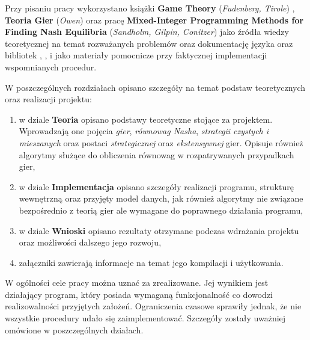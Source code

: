 \documentclass[polish]{standalone}
\begin{document}
Przy pisaniu pracy wykorzystano książki \textbf{Game Theory} (\textit{Fudenberg, Tirole}) \cite{FT-GT},
\textbf{Teoria Gier} (\textit{Owen}) \cite{O-GT} oraz pracę \textbf{Mixed-Integer Programming Methods for Finding Nash
Equilibria} (\textit{Sandholm, Gilpin, Conitzer}) \cite{SCG-NE} jako źródła wiedzy teoretycznej na temat rozważanych
problemów oraz dokumentację języka  oraz bibliotek , ,  i  jako
materiały pomocnicze przy faktycznej implementacji wspomnianych procedur.

W poszczególnych rozdziałach opisano szczegóły na temat podstaw teoretycznych oraz realizacji projektu:
\begin{enumerate}
\item w dziale \textbf{Teoria} opisano podstawy teoretyczne stojące za projektem. Wprowadzają one pojęcia \textit{gier},
\textit{równowag Nasha},
\textit{strategii czystych i mieszanych} oraz postaci \textit{strategicznej} oraz \textit{ekstensywnej} gier. Opisuje
również algorytmy służące do obliczenia równowag w rozpatrywanych przypadkach gier,
\item w dziale \textbf{Implementacja} opisano szczegóły realizacji programu, strukturę wewnętrzną oraz przyjęty model
danych, jak również algorytmy nie związane bezpośrednio z teorią gier ale wymagane do poprawnego działania programu,
\item w dziale \textbf{Wnioski} opisano rezultaty otrzymane podczas wdrażania projektu oraz możliwości dalszego jego
rozwoju,
\item załączniki zawierają informacje na temat jego kompilacji i użytkowania.
\end{enumerate}

W ogólności cele pracy można uznać za zrealizowane. Jej wynikiem jest działający program, który posiada wymaganą
funkcjonalność co dowodzi realizowalności przyjętych założeń. Ograniczenia czasowe sprawiły jednak, że nie wszystkie
procedury udało się zaimplementować. Szczegóły zostały uważniej omówione w poszczególnych działach.
\end{document}
